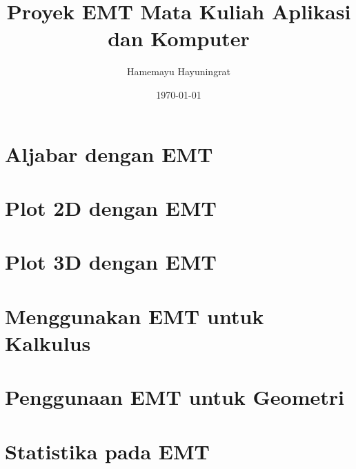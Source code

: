 \documentclass[indonesia]{report}
\title{Proyek EMT Mata Kuliah Aplikasi dan Komputer}
\author{Hamemayu Hayuningrat}
\date{\today}
\begin{document}
\maketitle

\tableofcontents

\chapter{Aljabar dengan EMT}


\chapter{Plot 2D dengan EMT}


\chapter{Plot 3D dengan EMT}


\chapter{Menggunakan EMT untuk Kalkulus}


\chapter{Penggunaan EMT untuk Geometri}


\chapter{Statistika pada EMT}

\end{document}
